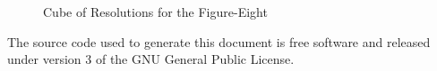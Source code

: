 \documentclass{article}
\theoremstyle{plain}
\begin{document}
        \begin{figure}
            \centering
            \caption{Cube of Resolutions for the Figure-Eight}
            \label{fig:figure_eight_knot_cube_of_resolutions}
        \end{figure}
    \newpage
    
    
    \newpage
    The source code used to generate this document is free software and released
    under version 3 of the GNU General Public License.
\end{document}
